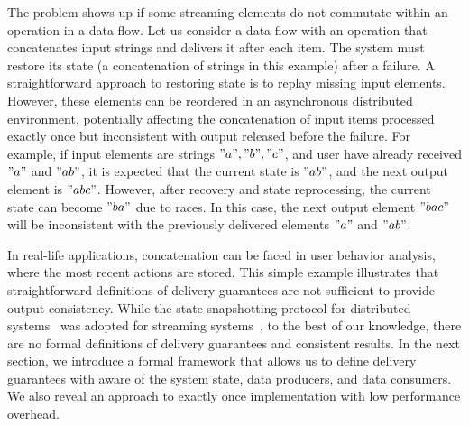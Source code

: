 The problem shows up if some streaming elements do not commutate within an operation in a data flow. 
Let us consider a data flow with an operation that concatenates input strings and delivers it after each item. 
The system must restore its state  (a concatenation of strings in this example) after a failure. 
A straightforward approach to restoring state is to replay missing input elements. 
However, these elements can be reordered in an asynchronous distributed environment, potentially affecting    the   concatenation   of input items processed  exactly once but  inconsistent with output  released before the failure. 
For example, if input elements are strings $"a","b","c"$, and user have already received  $"a"$ and $"ab"$, it is expected that the current state is $"ab"$, and the next output element is $"abc"$. However, after recovery and state reprocessing, the current state can become $"ba"$ due to races. In this case, the next output element $"bac"$ will be inconsistent with the previously delivered elements $"a"$ and $"ab"$.  

In real-life applications, concatenation can be faced in user behavior analysis, where the most recent actions are stored. 
This simple example illustrates that straightforward definitions of delivery guarantees are not sufficient to provide output consistency. 
While the state snapshotting protocol for distributed systems~\cite{Chandy:1985:DSD:214451.214456} was adopted for streaming systems~\cite{2015arXiv150608603C}, to the best of our knowledge, there are no formal definitions of delivery guarantees and consistent results. 
In the next  section, we introduce  a formal framework that allows us to define delivery guarantees with aware of the system state, data producers, and data consumers. 
We also reveal an approach to exactly once implementation with low performance overhead. 


\